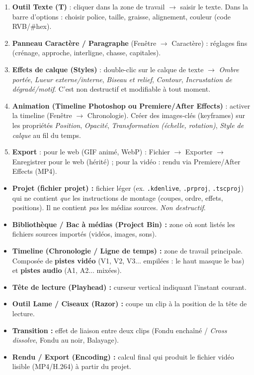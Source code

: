 \documentclass[11pt]{article}
\newcommand{\cle}[1]{{\popxbold\color{popdark}#1}}
\newcounter{popsec}
\newcounter{popsub}
\newcommand{\courssub}[1]{%
  \stepcounter{popsub}%
  \par\vspace{9pt}\noindent{\popxbold\fontsize{11.5}{13}\selectfont\color{popink}{\color{poporange}\thepopsec.\thepopsub}\hspace{6pt}#1}\par\nopagebreak\vspace{4pt}
}
\begin{document}
\begin{methode}
\begin{enumerate}
  \item \textbf{Outil Texte (T)} : cliquer dans la zone de travail $\to$ saisir le texte. Dans la barre d'options : choisir police, taille, graisse, alignement, couleur (code RVB/\#hex).
  \item \textbf{Panneau Caractère / Paragraphe} (Fenêtre $\to$ Caractère) : réglages fins (crénage, approche, interligne, chasse, capitales).
  \item \textbf{Effets de calque (Styles)} : double-clic sur le calque de texte $\to$ \emph{Ombre portée}, \emph{Lueur externe/interne}, \emph{Biseau et relief}, \emph{Contour}, \emph{Incrustation de dégradé/motif}. C'est non destructif et modifiable à tout moment.
  \item \textbf{Animation (Timeline Photoshop ou Premiere/After Effects)} : activer la timeline (Fenêtre $\to$ Chronologie). Créer des \cle{images-clés} (keyframes) sur les propriétés \emph{Position}, \emph{Opacité}, \emph{Transformation (échelle, rotation)}, \emph{Style de calque} au fil du temps.
  \item \textbf{Export} : pour le web (GIF animé, WebP) : Fichier $\to$ Exporter $\to$ Enregistrer pour le web (hérité) ; pour la vidéo : rendu via Premiere/After Effects (MP4).
\end{enumerate}
\end{methode}

\courssub{Montage vidéo avec un logiciel libre}

\begin{definition}
\begin{itemize}
  \item \textbf{Projet (fichier projet) :} fichier léger (ex. \texttt{.kdenlive}, \texttt{.prproj}, \texttt{.tscproj}) qui ne contient \emph{que} les instructions de montage (coupes, ordre, effets, positions). Il ne contient \emph{pas} les médias sources. \emph{Non destructif}.
  \item \textbf{Bibliothèque / Bac à médias (Project Bin) :} zone où sont listés les fichiers sources importés (vidéos, images, sons).
  \item \textbf{Timeline (Chronologie / Ligne de temps) :} zone de travail principale. Composée de \textbf{pistes vidéo} (V1, V2, V3... empilées : le haut masque le bas) et \textbf{pistes audio} (A1, A2... mixées).
  \item \textbf{Tête de lecture (Playhead) :} curseur vertical indiquant l'instant courant.
  \item \textbf{Outil Lame / Ciseaux (Razor) :} coupe un clip à la position de la tête de lecture.
  \item \textbf{Transition :} effet de liaison entre deux clips (Fondu enchaîné / \emph{Cross dissolve}, Fondu au noir, Balayage).
  \item \textbf{Rendu / Export (Encoding) :} calcul final qui produit le fichier vidéo lisible (MP4/H.264) à partir du projet.
\end{itemize}
\end{definition}
\end{document}
